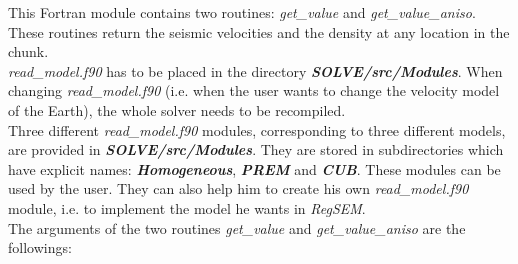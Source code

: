 This Fortran module contains two routines: \textit{get\_value} and \textit{get\_value\_aniso}. These routines
return the seismic velocities and the density at any location in the chunk.\\
\textit{read\_model.f90} has to be placed in the directory \textit{\bfseries SOLVE/src/Modules}. When changing
\textit{read\_model.f90} (i.e. when the user wants to change the velocity model of the Earth), the whole solver
needs to be recompiled.\\ 
Three different \textit{read\_model.f90} modules, corresponding to three different models, are provided in
\linebreak \textit{\bfseries SOLVE/src/Modules}. They are stored in subdirectories which have explicit names:
\textit{\bfseries Homogeneous}, \textit{\bfseries PREM} and \textit{\bfseries CUB}. These modules can be used
by the user. They can also help him to create his own \textit{read\_model.f90} module, i.e. to implement the
model he wants in \textit{RegSEM}.\\

The arguments of the two routines \textit{get\_value} and \textit{get\_value\_aniso} are the followings:

